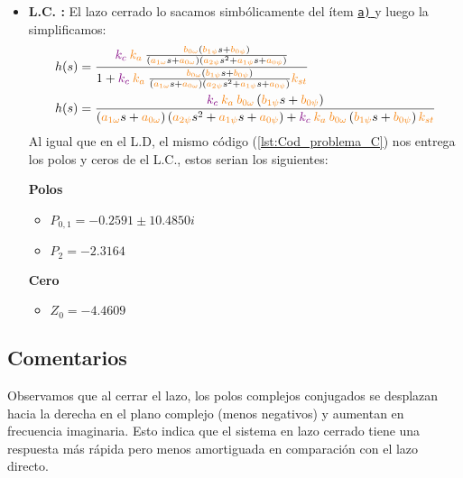 \begin{itemize}
    \item \textbf{L.C. :} El lazo cerrado lo sacamos simbólicamente del ítem \hyperref[pregunta-a]{\texttt{a)} } y luego la simplificamos:
    \begin{align*}
        &h(s) = \dfrac{\mora{k_c} \nara{k_a} \frac{\nara{\nara{b_{0\omega}}}\left(\nara{b_{1\psi}}s + \nara{b_{0\psi}}\right)}
        {\left(\nara{a_{1\omega}}s + \nara{a_{0\omega}}\right)\left(\nara{a_{2\psi}}s^{2} + \nara{a_{1\psi}}s + \nara{a_{0\psi}}\right)}}{1+\mora{k_c} \nara{k_a} \frac{\nara{\nara{b_{0\omega}}}\left(\nara{b_{1\psi}}s + \nara{b_{0\psi}}\right)}
        {\left(\nara{a_{1\omega}}s + \nara{a_{0\omega}}\right)\left(\nara{a_{2\psi}}s^{2} + \nara{a_{1\psi}}s + \nara{a_{0\psi}}\right)}\nara{k_{st}}} \\
        &h(s) = \dfrac{     \mora{k_c} \nara{k_a}    \nara{\nara{b_{0\omega}}}\left(\nara{b_{1\psi}}s + \nara{b_{0\psi}}\right) }  {     \left(\nara{a_{1\omega}}s + \nara{a_{0\omega}}\right)\left(\nara{a_{2\psi}}s^{2} + \nara{a_{1\psi}}s + \nara{a_{0\psi}}\right)    + \mora{k_c} \nara{k_a}     \nara{\nara{b_{0\omega}}}\left(\nara{b_{1\psi}}s + \nara{b_{0\psi}}\right)   
       \nara{k_{st}}}
    \end{align*}
    Al igual que en el L.D, el mismo código (\autoref{lst:Cod_problema_C}) nos entrega los polos y ceros de el L.C., estos serian los siguientes:
    \begin{multicols}{2}
        \textbf{Polos}
        \begin{itemize}
            \item \(P_{0,1} = -0.2591 \pm 10.4850i\) 
            \item \(P_2 = -2.3164 \)
        \end{itemize}
        \columnbreak
        \textbf{Cero}
        \begin{itemize}
            \item \(Z_0 = -4.4609\)
        \end{itemize}
      \end{multicols}
\end{itemize}





\FloatBarrier
\subsection{Comentarios}


Observamos que al cerrar el lazo, los polos complejos conjugados se desplazan hacia la derecha en el plano complejo (menos negativos) y aumentan en frecuencia imaginaria. Esto indica que el sistema en lazo cerrado tiene una respuesta más rápida pero menos amortiguada en comparación con el lazo directo.

